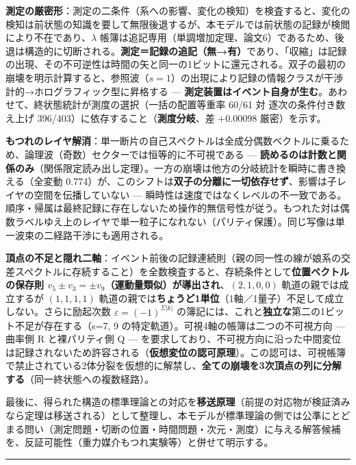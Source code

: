\documentclass[
]{ltjsarticle}
\begin{document}
\textbf{測定の厳密形}：測定の二条件（系への影響、変化の検知）を検査すると、変化の検知は前状態の知識を要して無限後退するが、本モデルでは前状態の記録が検閲により不在であり、\(\lambda\)
帳簿は追記専用（単調増加定理、論文6）であるため、後退は構造的に切断される。\textbf{測定＝記録の追記（無→有）}であり、「収縮」は記録の出現、その不可逆性は時間の矢と同一の1ビットに還元される。双子の最初の崩壊を明示計算すると、参照波（\(s=1\)）の出現により記録の情報クラスが干渉計的→ホログラフィック型に昇格する
---
\textbf{測定装置はイベント自身が生む}。あわせて、終状態統計が測度の選択（一括の配置等重率
60/61 対 逐次の条件付き数え上げ
396/403）に依存すること（\textbf{測度分岐}、差 \(+0.00098\)
厳密）を示す。

\textbf{もつれのレイヤ解消}：単一断片の自己スペクトルは全成分偶数ベクトルに乗るため、論理波（奇数）セクターでは恒等的に不可視である
---
\textbf{読めるのは計数と関係のみ}（関係限定読み出し定理）。一方の崩壊は他方の分岐統計を瞬時に書き換える（全変動
0.774）が、このシフトは\textbf{双子の分離に一切依存せず}、影響は子レイヤの空間を伝播していない
---
瞬時性は速度ではなくレベルの不一致である。順序・帰属は最終記録に存在しないため操作的無信号性が従う。もつれた対は偶数ラベルゆえ上のレイヤで単一粒子になれない（パリティ保護）。同じ写像は単一波束の二経路干渉にも適用される。

\textbf{頂点の不足と隠れ二軸}：イベント前後の記録連続則（親の同一性の線が娘系の交差スペクトルに存続すること）を全数検査すると、存続条件として\textbf{位置ベクトルの保存則
\(v_5\pm v_3=\pm v_9\)（運動量類似）が導出され}、\((2,1,0,0)\)
軌道の親では成立するが \((1,1,1,1)\)
軌道の親では\textbf{ちょうど1単位}（1軸／1量子）不足して成立しない。さらに励起次数
\(\varepsilon=(-1)^{\Sigma|k|}\)
の簿記には、これと\textbf{独立な}第二の1ビット不足が存在する（s=7, 9
の特定軌道）。可視4軸の帳簿は二つの不可視方向 --- 曲率側 R
と裸パリティ側 Q ---
を要求しており、不可視方向に沿った中間変位は記録されないため許容される（\textbf{仮想変位の認可原理}）。この認可は、可視帳簿で禁止されている2体分裂を仮想的に解禁し、\textbf{全ての崩壊を3次頂点の列に分解する}（同一終状態への複数経路）。

最後に、得られた構造の標準理論との対応を\textbf{移送原理}（前提の対応物が検証済みなら定理は移送される）として整理し、本モデルが標準理論の側では公準にとどまる問い（測定問題・切断の位置・時間問題・次元・測度）に与える解答候補を、反証可能性（重力媒介もつれ実験等）と併せて明示する。

\begin{center}\rule{0.5\linewidth}{0.5pt}\end{center}
\end{document}
